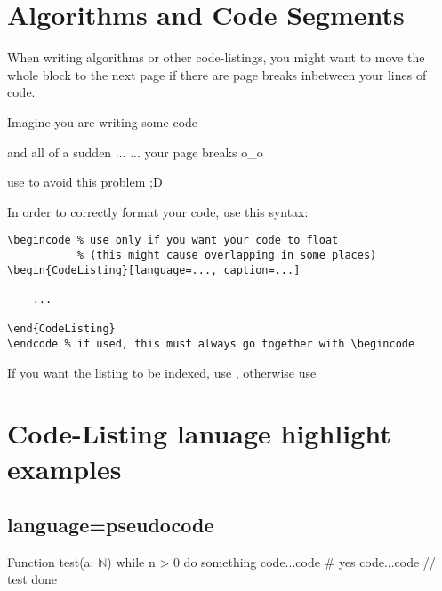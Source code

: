 \documentclass[
    narrow,
    fontstyle=light,
    babelparam=ngerman
]{elite}
\begin{document}
\begin{CodeListing}
\end{CodeListing}


\section{Algorithms and Code Segments}
\label{sec:algorithms-and-code-segments}

When writing algorithms or other code-listings, you might want to move the whole block to the
next page if there are page breaks inbetween your lines of code.

\vspace{1em}

\begin{CodeListing}[caption=Code-Listing Positioning]
Imagine you are writing some code

and all of a sudden
...
...
your page breaks o_o

use \filbreak to avoid this problem ;D
\end{CodeListing}

In order to correctly format your code, use this syntax:
\begin{verbatim}
\begincode % use only if you want your code to float
           % (this might cause overlapping in some places)
\begin{CodeListing}[language=..., caption=...]

    ...

\end{CodeListing}
\endcode % if used, this must always go together with \begincode
\end{verbatim}

If you want the listing to be indexed, use , otherwise use 

\section*{Code-Listing lanuage highlight examples}

\subsection{language=pseudocode}
\label{subsec:language=pseudocode}

\begin{CodeListing}[language=pseudocode]
Function test(a: $\mathbb{N}$) {
    while n > 0 do
        something
        code...code    # yes
        code...code    // test
    done
}
\end{CodeListing}
\end{document}
